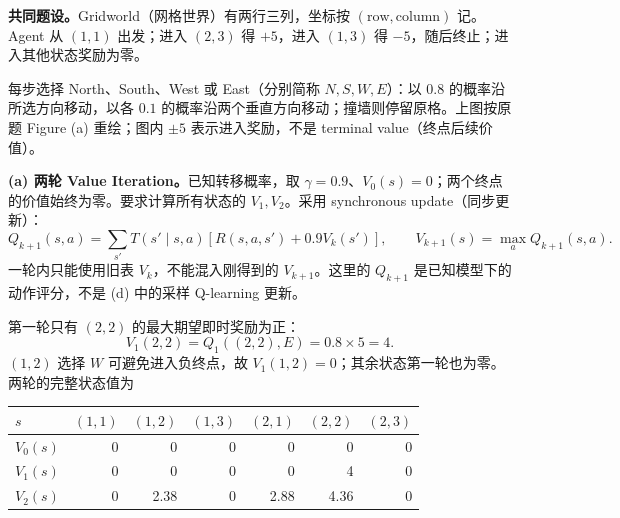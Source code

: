 \textbf{共同题设。}Gridworld（网格世界）有两行三列，坐标按 $(\text{row},\text{column})$ 记。Agent 从 $(1,1)$ 出发；进入 $(2,3)$ 得 $+5$，进入 $(1,3)$ 得 $-5$，随后终止；进入其他状态奖励为零。

\begin{center}
  
\end{center}

每步选择 North、South、West 或 East（分别简称 $N,S,W,E$）：以 $0.8$ 的概率沿所选方向移动，以各 $0.1$ 的概率沿两个垂直方向移动；撞墙则停留原格。上图按原题 Figure (a) 重绘；图内 $\pm5$ 表示进入奖励，不是 terminal value（终点后续价值）。

\begin{checkedsolution}
\nopagebreak[4]
\textbf{(a) 两轮 Value Iteration。}已知转移概率，取 $\gamma=0.9$、$V_0(s)=0$；两个终点的价值始终为零。要求计算所有状态的 $V_1,V_2$。采用 synchronous update（同步更新）：
\[
  Q_{k+1}(s,a)=\sum_{s'}T(s'\mid s,a)
  [R(s,a,s')+0.9V_k(s')],\qquad
  V_{k+1}(s)=\max_a Q_{k+1}(s,a).
\]
一轮内只能使用旧表 $V_k$，不能混入刚得到的 $V_{k+1}$。这里的 $Q_{k+1}$ 是已知模型下的动作评分，不是 (d) 中的采样 Q-learning 更新。

第一轮只有 $(2,2)$ 的最大期望即时奖励为正：
\[
  V_1(2,2)=Q_1((2,2),E)=0.8\times5=4.
\]
$(1,2)$ 选择 $W$ 可避免进入负终点，故 $V_1(1,2)=0$；其余状态第一轮也为零。两轮的完整状态值为
\begin{center}
\begin{tabular}{@{}lrrrrrr@{}}
  \toprule
  $s$ & $(1,1)$ & $(1,2)$ & $(1,3)$ & $(2,1)$ & $(2,2)$ & $(2,3)$ \\
  \midrule
  $V_0(s)$ & 0 & 0 & 0 & 0 & 0 & 0 \\
  $V_1(s)$ & 0 & 0 & 0 & 0 & 4 & 0 \\
  $V_2(s)$ & 0 & 2.38 & 0 & 2.88 & 4.36 & 0 \\
  \bottomrule
\end{tabular}
\end{center}


\end{checkedsolution}
